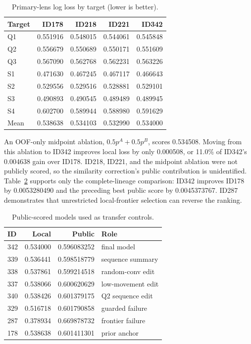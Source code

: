 \documentclass[conference]{IEEEtran}
\begin{document}
\begin{table}[t]
\centering
\caption{Primary-lens log loss by target (lower is better).}
\label{tab:target_losses}
\begin{tabular}{@{}lrrrr@{}}
\toprule
Target & ID178 & ID218 & ID221 & ID342 \\
\midrule
Q1 & 0.551916 & 0.548015 & 0.544061 & 0.545848 \\
Q2 & 0.556679 & 0.550689 & 0.550171 & 0.551609 \\
Q3 & 0.567090 & 0.562768 & 0.562231 & 0.563226 \\
S1 & 0.471630 & 0.467245 & 0.467117 & 0.466643 \\
S2 & 0.529556 & 0.529516 & 0.528881 & 0.529101 \\
S3 & 0.490893 & 0.490545 & 0.489489 & 0.489945 \\
S4 & 0.602700 & 0.589944 & 0.588980 & 0.591629 \\
\midrule
Mean & 0.538638 & 0.534103 & 0.532990 & 0.534000 \\
\bottomrule
\end{tabular}
\end{table}

An OOF-only midpoint ablation, $0.5p^{A}+0.5p^{B}$, scores 0.534508. Moving from this ablation to ID342 improves local loss by only 0.000508, or 11.0\% of ID342's 0.004638 gain over ID178. ID218, ID221, and the midpoint ablation were not publicly scored, so the similarity correction's public contribution is unidentified. Table~\ref{tab:public_results} supports only the complete-lineage comparison: ID342 improves ID178 by 0.0053280490 and the preceding best public score by 0.0045373767. ID287 demonstrates that unrestricted local-frontier selection can reverse the ranking.

\begin{table}[t]
\centering
\caption{Public-scored models used as transfer controls.}
\label{tab:public_results}
\begin{tabular}{@{}lrrl@{}}
\toprule
ID & Local & Public & Role \\
\midrule
342 & 0.534000 & 0.596083252 & final model \\
339 & 0.536441 & 0.598518779 & sequence summary \\
338 & 0.537861 & 0.599214518 & random-conv edit \\
337 & 0.538066 & 0.600620629 & low-movement edit \\
340 & 0.538426 & 0.601379175 & Q2 sequence edit \\
329 & 0.516718 & 0.601790858 & guarded failure \\
287 & 0.378934 & 0.669878732 & frontier failure \\
178 & 0.538638 & 0.601411301 & prior anchor \\
\bottomrule
\end{tabular}
\end{table}
\end{document}

